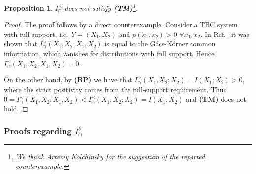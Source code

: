 \documentclass{article}
\newcommand{\TM}{\textbf{(TM)}\xspace} %
\newcommand{\BP}{\textbf{(BP)}\xspace} %
\newcommand{\Iprec}{\ensuremath{I_\cap^{\prec}}\xspace}
\newcommand{\Idelta}{\ensuremath{I_\cap^{\delta}}\xspace}
\newtheorem{proposition}{Proposition}
\begin{document}
\begin{proposition} \label{prop:Prec-noTM}
    $\Iprec$ does not satisfy \TM\footnote{We thank Artemy Kolchinsky for the suggestion of the reported counterexample.}.
\end{proposition}
\begin{proof}
    The proof follows by a direct counterexample. Consider a TBC system with full support, i.e.\ $Y=(X_1,X_2)$ and $p(x_1,x_2)>0$ $\forall x_1, x_2$. In Ref.~\cite{kolchinsky2022novel} it was shown that $\Iprec(X_1,X_2;X_1,X_2)$ is equal to the G\'acs-K\"orner common information, which vanishes for distributions with full support. Hence $\Iprec(X_1,X_2;X_1,X_2)=0$. 
    
    On the other hand, by \BP we have that $\Iprec(X_1,X_2;X_2)=I(X_1;X_2)>0$, where the strict positivity comes from the full-support requirement. Thus $0=\Iprec(X_1,X_2;X_1,X_2)<\Iprec(X_1,X_2;X_2)=I(X_1;X_2)$ and \TM does not hold.
\end{proof}


\subsubsection{Proofs regarding \Idelta}
\end{document}
